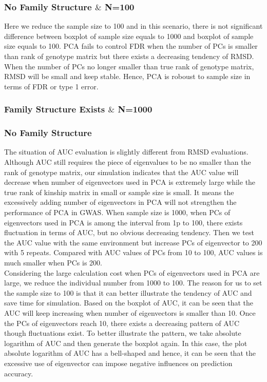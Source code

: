 \documentclass[12pt]{article}
\theoremstyle{definition}
\theoremstyle{plain}
\begin{document}
\subsubsection{No Family Structure $\&$ N=100}
Here we reduce the sample size to 100 and in this scenario, there is not significant difference between boxplot of sample size equals to 1000 and boxplot of sample size equals to 100. PCA fails to control FDR when the number of PCs is smaller than rank of genotype matrix but there exists a decreasing tendency of RMSD. When the number of PCs no longer smaller than true rank of genotype matrix, RMSD will be small and keep stable. Hence, PCA is roboust to sample size in terms of FDR or type 1 error.

\subsubsection{Family Structure Exists $\&$ N=1000}

\subsubsection{No Family Structure}
The situation of AUC evaluation is slightly different from RMSD evaluations. Although AUC still requires the piece of eigenvalues to be no smaller than the rank of genotype matrix, our simulation indicates that the AUC value will decrease when number of eigenvectors used in PCA is extremely large while the true rank of kinship matrix in small or sample size is small. It means the excessively adding number of eigenvectors in PCA will not strengthen the performance of PCA in GWAS.
When sample size is 1000, when PCs of eigenvectors used in PCA is among the interval from 1p to 100, there exists fluctuation in terms of AUC, but no obvious decreasing tendency. Then we test the AUC value with the same environment but increase PCs of eigenvector to 200 with 5 repeats. Compared with AUC values of PCs from 10 to 100, AUC values is much smaller when PCs is 200.\\
 Considering the large calculation cost when PCs of eigenvectors used in PCA are large, we reduce the individual number from 1000 to 100. The reason for us to set the sample size to 100 is that it can better illustrate the tendency of AUC and save time for simulation. Based on the boxplot of AUC, it can be seen that the AUC will keep increasing when number of eigenvectors is smaller than 10. Once the PCs of eigenvectors reach 10, there exists a decreasing pattern of AUC though fluctuations exist. To better illustrate the pattern, we take absolute logarithm of AUC and then generate the boxplot again. In this case, the plot absolute logarithm of AUC has a bell-shaped and hence, it can be seen that the excessive use of eigenvector can impose negative influences on prediction accuracy.\\
\end{document}
